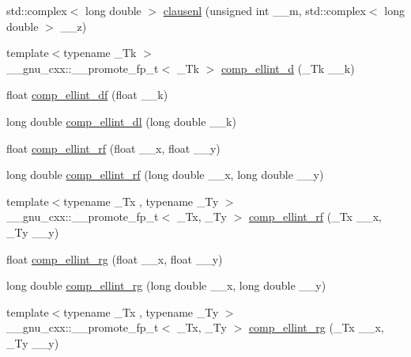 \begin{DoxyCompactItemize}
std\+::complex$<$ long double $>$ \hyperlink{group__gnu__math__spec__func_gae39368808280f5c1b80dce7c2f4a67a7}{clausenl} (unsigned int \+\_\+\+\_\+m, std\+::complex$<$ long double $>$ \+\_\+\+\_\+z)
\item 
{\footnotesize template$<$typename \+\_\+\+Tk $>$ }\\\+\_\+\+\_\+gnu\+\_\+cxx\+::\+\_\+\+\_\+promote\+\_\+fp\+\_\+t$<$ \+\_\+\+Tk $>$ \hyperlink{group__gnu__math__spec__func_ga2c6b6c5a44ea00f0aed05c02f1072c31}{comp\+\_\+ellint\+\_\+d} (\+\_\+\+Tk \+\_\+\+\_\+k)
\item 
float \hyperlink{group__gnu__math__spec__func_ga34ac6488b0e7531d5d4b7a8e31ff864e}{comp\+\_\+ellint\+\_\+df} (float \+\_\+\+\_\+k)
\item 
long double \hyperlink{group__gnu__math__spec__func_ga494931ec0a271b79f1fdcfdf929e3138}{comp\+\_\+ellint\+\_\+dl} (long double \+\_\+\+\_\+k)
\item 
float \hyperlink{group__gnu__math__spec__func_ga55ae30b4f8ff15017d18a80050e14e38}{comp\+\_\+ellint\+\_\+rf} (float \+\_\+\+\_\+x, float \+\_\+\+\_\+y)
\item 
long double \hyperlink{group__gnu__math__spec__func_gae1d468487f1711e91719a9c6392f3c35}{comp\+\_\+ellint\+\_\+rf} (long double \+\_\+\+\_\+x, long double \+\_\+\+\_\+y)
\item 
{\footnotesize template$<$typename \+\_\+\+Tx , typename \+\_\+\+Ty $>$ }\\\+\_\+\+\_\+gnu\+\_\+cxx\+::\+\_\+\+\_\+promote\+\_\+fp\+\_\+t$<$ \+\_\+\+Tx, \+\_\+\+Ty $>$ \hyperlink{group__gnu__math__spec__func_ga78dc5f41ec8b69ed822612a72d326109}{comp\+\_\+ellint\+\_\+rf} (\+\_\+\+Tx \+\_\+\+\_\+x, \+\_\+\+Ty \+\_\+\+\_\+y)
\item 
float \hyperlink{group__gnu__math__spec__func_ga978f8eec6e5edc918b243925dbacb65b}{comp\+\_\+ellint\+\_\+rg} (float \+\_\+\+\_\+x, float \+\_\+\+\_\+y)
\item 
long double \hyperlink{group__gnu__math__spec__func_gaca5fa8ee8125afc8f35ec6b27806e873}{comp\+\_\+ellint\+\_\+rg} (long double \+\_\+\+\_\+x, long double \+\_\+\+\_\+y)
\item 
{\footnotesize template$<$typename \+\_\+\+Tx , typename \+\_\+\+Ty $>$ }\\\+\_\+\+\_\+gnu\+\_\+cxx\+::\+\_\+\+\_\+promote\+\_\+fp\+\_\+t$<$ \+\_\+\+Tx, \+\_\+\+Ty $>$ \hyperlink{group__gnu__math__spec__func_gad0ab2cfa6c4669440c47ab53cfa332ec}{comp\+\_\+ellint\+\_\+rg} (\+\_\+\+Tx \+\_\+\+\_\+x, \+\_\+\+Ty \+\_\+\+\_\+y)
\item 

\end{DoxyCompactItemize}
